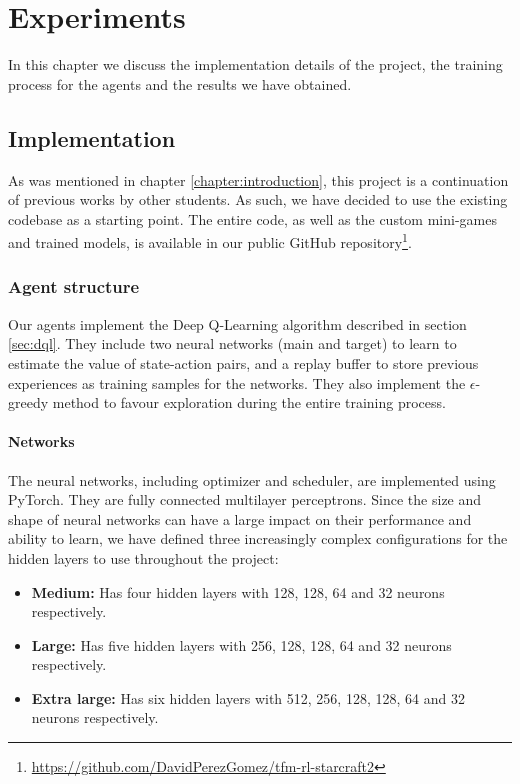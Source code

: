 \chapter{Experiments}
\label{chapter:experiments}

In this chapter we discuss the implementation details of the project, the training process for the agents and the results we have obtained.

\section{Implementation}

As was mentioned in chapter \ref{chapter:introduction}, this project is a continuation of previous works by other students. As such, we have decided to use the existing codebase as a starting point. The entire code, as well as the custom mini-games and trained models, is available in our public GitHub repository\footnote{\url{https://github.com/DavidPerezGomez/tfm-rl-starcraft2}}.

\subsection{Agent structure}
\label{sec:agent_structure}

Our agents implement the Deep Q-Learning algorithm described in section \ref{sec:dql}. They include two neural networks (main and target) to learn to estimate the value of state-action pairs, and a replay buffer to store previous experiences as training samples for the networks. They also implement the $\epsilon$-greedy method to favour exploration during the entire training process.

\subsubsection*{Networks}

The neural networks, including optimizer and scheduler, are implemented using PyTorch. They are fully connected multilayer perceptrons. Since the size and shape of neural networks can have a large impact on their performance and ability to learn, we have defined three increasingly complex configurations for the hidden layers to use throughout the project:

\begin{itemize}
    \item \textbf{Medium:} Has four hidden layers with 128, 128, 64 and 32 neurons respectively.
    \item \textbf{Large:} Has five hidden layers with 256, 128, 128, 64 and 32 neurons respectively.
    \item \textbf{Extra large:} Has six hidden layers with 512, 256, 128, 128, 64 and 32 neurons respectively.
\end{itemize}


